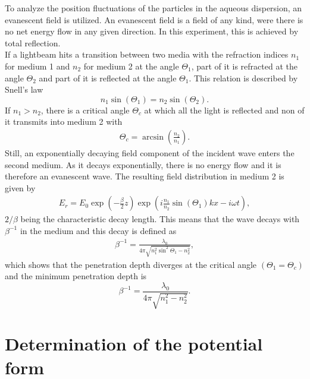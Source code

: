 \documentclass[.../bericht]{subfilies}
\begin{document}
        To analyze the position fluctuations of the particles in the aqueous dispersion, an evanescent field is utilized. An evanescent field is a field of any kind, were there is no net energy flow in any given direction. In this experiment, this is achieved by total reflection. \\
        If  a lightbeam hits a transition between two media with the refraction indices $n_1$ for medium 1 and $n_2$ for medium 2 at the angle $\Theta_1$, part of it is refracted at the angle $\Theta_2$ and part of it is reflected at the angle $\Theta_1$. This relation is described by Snell's law
        \begin{equation*}
          n_1 \sin(\Theta_1)=n_2 \sin(\Theta_2).
        \end{equation*}
        If $n_1>n_2$, there is a critical angle $\Theta_c$ at which all the light is reflected and non of it transmits into medium 2 with
        \begin{align*}
          \Theta_c=\arcsin\left(\frac{n_2}{n_1}\right).
        \end{align*}
        Still, an exponentially decaying field component of the incident wave enters the second medium. As it decays exponentially, there is no energy flow and it is therefore an evanescent wave. The resulting field distribution in medium 2 is given by
        \begin{align*}
          E_r=E_0 \exp\left( -\frac{\beta}{2}z \right) \exp\left( i\frac{n_1}{n_2}\sin(\Theta_1)kx-i\omega t \right),
        \end{align*}
        $2/\beta$ being the characteristic decay length. This means that the wave decays with $\beta^{-1}$ in the medium and this decay is defined as
        \begin{align*}
          \beta^{-1}=\frac{\lambda_0}{4 \pi \sqrt{n_1^2 \sin^2\Theta_1-n_2^2}},
        \end{align*}
        which shows that the penetration depth diverges at the critical angle $(\Theta_1=\Theta_c)$ and the minimum penetration depth is
        \begin{equation*}
          \beta^{-1}=\frac{\lambda_0}{4 \pi \sqrt{n_1^2-n_2^2}}.
        \end{equation*}
        \cite{helden}


      \section{Determination of the potential form}
      \label{sec:determination}
\end{document}
